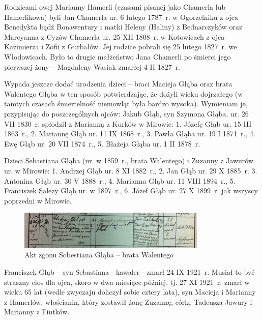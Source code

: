 Rodzicami owej Marianny Hamerli (czasami pisanej jako Chamerla lub Hamerlikowa) byli Jan Chamerla ur. 6 lutego 1787~r. w Ogorzelniku z ojca Benedykta bądź Bonawentury i matki Heleny (Haliny) z Bednarczyków oraz Marcyanna z Cyzów Chamerla ur. 25 XII 1808~r. w Kotowicach z ojca Kazimierza i Zofii z Gurbałów. Jej rodzice pobrali się 25 lutego 1827~r. we Włodowicach. Było to drugie małżeństwo Jana Chamerli po śmierci jego pierwszej żony -- Magdaleny Wasiak zmarłej 4 II 1827~r.


Wypada jeszcze dodać urodzenia dzieci -- braci Macieja Głąba oraz brata Walentego Głąba w ten sposób potwierdzając, że dożyli wieku dojrzałego (w tamtych czasach śmiertelność niemowląt była bardzo wysoka). Wymieniam je, przypisując do poszczególnych ojców: Jakub Głąb, syn Szymona Głąba, ur. 26 VII 1830~r. spłodził z Marianną z Kurków w Mirowie: 1. Józefę Głąb ur. 15 III 1863~r., 2. Mariannę Głąb ur. 11 IX 1868~r., 3. Pawła Głąba ur. 19 I 1871~r., 4. Ewę Głąb ur. 20 VII 1874~r., 5. Błażeja Głąba ur. 1 II 1878~r.

Dzieci Sebastiana Głąba (ur. w 1859~r., brata Walentego) i Zuzanny z Jawurów ur. w Mirowie: 1. Andrzej Głąb ur. 8 XI 1882~r., 2. Jan Głąb ur. 29 X 1885~r. 3. Antonina Głąb ur. 30 V 1888~r., 4. Marianna Głąb ur. 11 VIII 1894~r., 5. Franciszek Salezy Głąb ur. w 1897~r., 6. Józef Głąb ur. 27 X 1899~r. jak wszyscy poprzedni w Mirowie.

\begin{figure}[!h]
\begin{center}
\includegraphics[width=0.8\textwidth]{zdjecia/akt_zgonu_sobestiana_glaba.jpg}
\caption[Akt zgonu Sobestiana Głąba]{Akt zgonu Sobestiana Głąba -- brata Walentego}
\label{rys:akt_zgonu_sobestiana_glaba}
\end{center}
\end{figure}

Franciszek Głąb -- syn Sebastiana - kawaler - zmarł 24 IX 1921~r. Musiał to być straszny cios dla ojca, skoro w dwa miesiące później, tj. 27 XI 1921~r. zmarł w wieku 65 lat (wedle zwyczaju doliczył sobie cztery lata), syn Macieja i Marianny z Hamerlów, włościanin, który zostawił żonę Zuzannę, córkę Tadeusza Jawury i Marianny z Fiutków.

